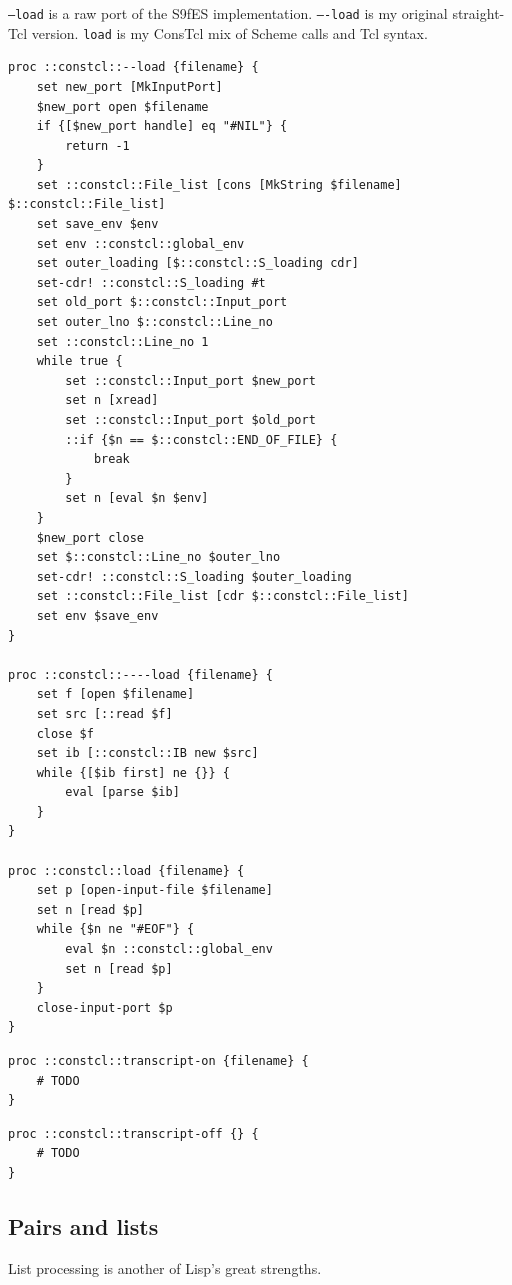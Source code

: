 \documentclass[twoside,9pt]{report}
\begin{document}
\texttt{--load} is a raw port of the S9fES implementation. \texttt{----load} is my original straight-Tcl version. \texttt{load} is my ConsTcl mix of Scheme calls and Tcl syntax.

\noindent\makebox[\linewidth]{\rule{\linewidth}{0.4pt}}
\begin{lstlisting}
proc ::constcl::--load {filename} {
    set new_port [MkInputPort]
    $new_port open $filename
    if {[$new_port handle] eq "#NIL"} {
        return -1
    }
    set ::constcl::File_list [cons [MkString $filename] $::constcl::File_list]
    set save_env $env
    set env ::constcl::global_env
    set outer_loading [$::constcl::S_loading cdr]
    set-cdr! ::constcl::S_loading #t
    set old_port $::constcl::Input_port
    set outer_lno $::constcl::Line_no
    set ::constcl::Line_no 1
    while true {
        set ::constcl::Input_port $new_port
        set n [xread]
        set ::constcl::Input_port $old_port
        ::if {$n == $::constcl::END_OF_FILE} {
            break
        }
        set n [eval $n $env]
    }
    $new_port close
    set $::constcl::Line_no $outer_lno
    set-cdr! ::constcl::S_loading $outer_loading
    set ::constcl::File_list [cdr $::constcl::File_list]
    set env $save_env
}
 
proc ::constcl::----load {filename} {
    set f [open $filename]
    set src [::read $f]
    close $f
    set ib [::constcl::IB new $src]
    while {[$ib first] ne {}} {
        eval [parse $ib]
    }
}
 
proc ::constcl::load {filename} {
    set p [open-input-file $filename]
    set n [read $p]
    while {$n ne "#EOF"} {
        eval $n ::constcl::global_env
        set n [read $p]
    }
    close-input-port $p
}
\end{lstlisting}
\noindent\makebox[\linewidth]{\rule{\linewidth}{0.4pt}}
\noindent\makebox[\linewidth]{\rule{\linewidth}{0.4pt}}
\begin{lstlisting}
proc ::constcl::transcript-on {filename} {
    # TODO
}
\end{lstlisting}
\noindent\makebox[\linewidth]{\rule{\linewidth}{0.4pt}}
\noindent\makebox[\linewidth]{\rule{\linewidth}{0.4pt}}
\begin{lstlisting}
proc ::constcl::transcript-off {} {
    # TODO
}
\end{lstlisting}
\noindent\makebox[\linewidth]{\rule{\linewidth}{0.4pt}}
\subsection{Pairs and lists}
\label{pairs-and-lists}

List processing is another of Lisp's great strengths.
\end{document}
